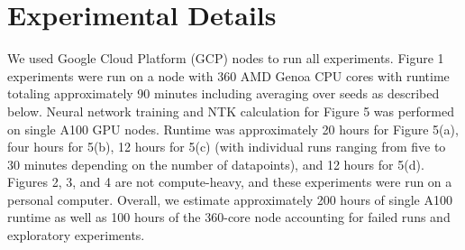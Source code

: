 \documentclass{article}
\theoremstyle{plain}
\theoremstyle{definition}
\theoremstyle{remark}
\begin{document}




\clearpage
\section{Experimental Details}
\label{app:experimental-details}
We used Google Cloud Platform (GCP) nodes to run all experiments. Figure 1 experiments were run on a node with 360 AMD Genoa CPU cores with runtime totaling approximately 90 minutes including averaging over seeds as described below. Neural network training and NTK calculation for Figure 5 was performed on single A100 GPU nodes. Runtime was approximately 20 hours for Figure 5(a), four hours for 5(b), 12 hours for 5(c) (with individual runs ranging from five to 30 minutes depending on the number of datapoints), and 12 hours for 5(d).  Figures 2, 3, and 4 are not compute-heavy, and these experiments were run on a personal computer. Overall, we estimate approximately 200 hours of single A100 runtime as well as 100 hours of the 360-core node accounting for failed runs and exploratory experiments.
\end{document}
